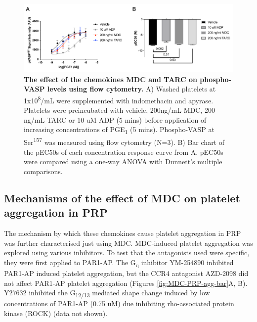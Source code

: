 \documentclass[11pt,twoside]{bristolthesis}
\begin{document}
\begin{figure}

{\centering \includegraphics[width=0.9\linewidth]{figure/Chemokines/Layouts/MDC_TARC_VASP_FACS_logec50} 

}

\caption[The effect of the chemokines MDC and TARC on phospho-VASP levels using flow cytometry]{\textbf{The effect of the chemokines MDC and TARC on phospho-VASP levels using flow cytometry.} A) Washed platelets at 1x10\textsuperscript{8}/mL were supplemented with indomethacin and apyrase. Platelets were preincubated with vehicle, 200ng/mL MDC, 200 ng/mL TARC or 10 uM ADP (5 mins) before application of increasing concentrations of PGE\textsubscript{1} (5 mins). Phospho-VASP at Ser\textsuperscript{157} was measured using flow cytometry (N=3). B) Bar chart of the pEC50s of each concentration response curve from A. pEC50s were compared using a one-way ANOVA with Dunnett's multiple comparisons.}\label{fig:MDC-TARC-VASP-FACS}
\end{figure}
\hypertarget{mechanisms-of-the-effect-of-mdc-on-platelet-aggregation-in-prp}{%
\subsection{Mechanisms of the effect of MDC on platelet aggregation in PRP}\label{mechanisms-of-the-effect-of-mdc-on-platelet-aggregation-in-prp}}

The mechanism by which these chemokines cause platelet aggregation in PRP was further characterised just using MDC. MDC-induced platelet aggregation was explored using various inhibitors. To test that the antagonists used were specific, they were first applied to PAR1-AP. The G\textsubscript{q} inhibitor YM-254890 inhibited PAR1-AP induced platelet aggregation, but the CCR4 antagonist AZD-2098 did not affect PAR1-AP platelet aggregation (Figures \ref{fig:MDC-PRP-agg-bar}A, B). Y27632 inhibited the G\textsubscript{12/13} mediated shape change induced by low concentrations of PAR1-AP (0.75 uM) due inhibiting rho-associated protein kinase (ROCK) (data not shown).
\end{document}

